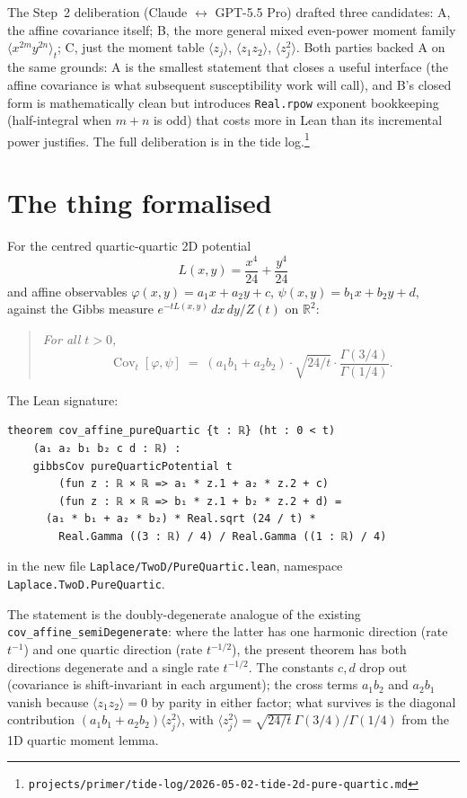 \documentclass[11pt]{article}
\begin{document}
The Step~2 deliberation (Claude $\leftrightarrow$ GPT-5.5 Pro) drafted
three candidates: A, the affine covariance itself; B, the more general
mixed even-power moment family $\langle x^{2m} y^{2n}\rangle_t$; C, just
the moment table $\langle z_j\rangle$, $\langle z_1 z_2\rangle$,
$\langle z_j^2\rangle$. Both parties backed A on the same grounds: A is
the smallest statement that closes a useful interface (the affine
covariance is what subsequent susceptibility work will call), and B's
closed form is mathematically clean but introduces \texttt{Real.rpow}
exponent bookkeeping (half-integral when $m+n$ is odd) that costs more
in Lean than its incremental power justifies. The full deliberation is
in the tide
log.\footnote{\texttt{projects/primer/tide-log/2026-05-02-tide-2d-pure-quartic.md}}

\section{The thing formalised}

For the centred quartic-quartic 2D potential
\[
  L(x,y) = \frac{x^4}{24} + \frac{y^4}{24}
\]
and affine observables $\varphi(x,y) = a_1 x + a_2 y + c$,
$\psi(x,y) = b_1 x + b_2 y + d$, against the Gibbs measure
$e^{-t L(x,y)}\,dx\,dy / Z(t)$ on $\mathbb{R}^2$:

\begin{quote}\itshape
For all $t > 0$,
\[
  \operatorname{Cov}_t[\varphi,\psi]
  \;=\; (a_1 b_1 + a_2 b_2) \cdot \sqrt{24/t} \cdot
        \frac{\Gamma(3/4)}{\Gamma(1/4)}.
\]
\end{quote}

\noindent The Lean signature:
\begin{verbatim}
theorem cov_affine_pureQuartic {t : ℝ} (ht : 0 < t)
    (a₁ a₂ b₁ b₂ c d : ℝ) :
    gibbsCov pureQuarticPotential t
        (fun z : ℝ × ℝ => a₁ * z.1 + a₂ * z.2 + c)
        (fun z : ℝ × ℝ => b₁ * z.1 + b₂ * z.2 + d) =
      (a₁ * b₁ + a₂ * b₂) * Real.sqrt (24 / t) *
        Real.Gamma ((3 : ℝ) / 4) / Real.Gamma ((1 : ℝ) / 4)
\end{verbatim}

\noindent in the new file \texttt{Laplace/TwoD/PureQuartic.lean}, namespace
\texttt{Laplace.TwoD.PureQuartic}.

The statement is the doubly-degenerate analogue of the existing
\texttt{cov\_affine\_semiDegenerate}: where the latter has one harmonic
direction (rate $t^{-1}$) and one quartic direction (rate $t^{-1/2}$), the
present theorem has both directions degenerate and a single rate
$t^{-1/2}$. The constants $c, d$ drop out (covariance is shift-invariant in
each argument); the cross terms $a_1 b_2$ and $a_2 b_1$ vanish because
$\langle z_1 z_2\rangle = 0$ by parity in either factor; what survives is
the diagonal contribution $(a_1 b_1 + a_2 b_2) \langle z_j^2\rangle$, with
$\langle z_j^2\rangle = \sqrt{24/t}\,\Gamma(3/4)/\Gamma(1/4)$ from the 1D
quartic moment lemma.
\end{document}
